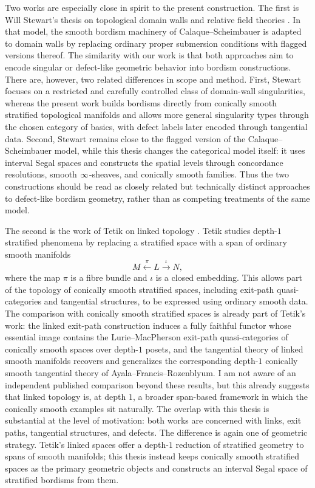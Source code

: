Two works are especially close in spirit to the present construction. The first is Will Stewart's thesis on topological domain walls and relative field theories \cite{Ste24}. In that model, the smooth bordism machinery of Calaque--Scheimbauer is adapted to domain walls by replacing ordinary proper submersion conditions with flagged versions thereof. The similarity with our work is that both approaches aim to encode singular or defect-like geometric behavior into bordism constructions. There are, however, two related differences in scope and method. First, Stewart focuses on a restricted and carefully controlled class of domain-wall singularities, whereas the present work builds bordisms directly from conically smooth stratified topological manifolds and allows more general singularity types through the chosen category of basics, with defect labels later encoded through tangential data. Second, Stewart remains close to the flagged version of the Calaque--Scheimbauer model, while this thesis changes the categorical model itself: it uses interval Segal spaces and constructs the spatial levels through concordance resolutions, smooth $\operatorname{\infty}$-sheaves, and conically smooth families. Thus the two constructions should be read as closely related but technically distinct approaches to defect-like bordism geometry, rather than as competing treatments of the same model.

The second is the work of Tetik on linked topology \cite{Tet23,Tet22}. Tetik studies depth-$1$ stratified phenomena by replacing a stratified space with a span of ordinary smooth manifolds
\[
M \xleftarrow{\pi} L \xrightarrow{\iota} N,
\]
where the map $\pi$ is a fibre bundle and $\iota$ is a closed embedding. This allows part of the topology of conically smooth stratified spaces, including exit-path quasi-categories and tangential structures, to be expressed using ordinary smooth data. The comparison with conically smooth stratified spaces is already part of Tetik's work: the linked exit-path construction induces a fully faithful functor whose essential image contains the Lurie--MacPherson exit-path quasi-categories of conically smooth spaces over depth-$1$ posets, and the tangential theory of linked smooth manifolds recovers and generalizes the corresponding depth-$1$ conically smooth tangential theory of Ayala--Francis--Rozenblyum. I am not aware of an independent published comparison beyond these results, but this already suggests that linked topology is, at depth $1$, a broader span-based framework in which the conically smooth examples sit naturally. The overlap with this thesis is substantial at the level of motivation: both works are concerned with links, exit paths, tangential structures, and defects. The difference is again one of geometric strategy. Tetik's linked spaces offer a depth-$1$ reduction of stratified geometry to spans of smooth manifolds; this thesis instead keeps conically smooth stratified spaces as the primary geometric objects and constructs an interval Segal space of stratified bordisms from them.

